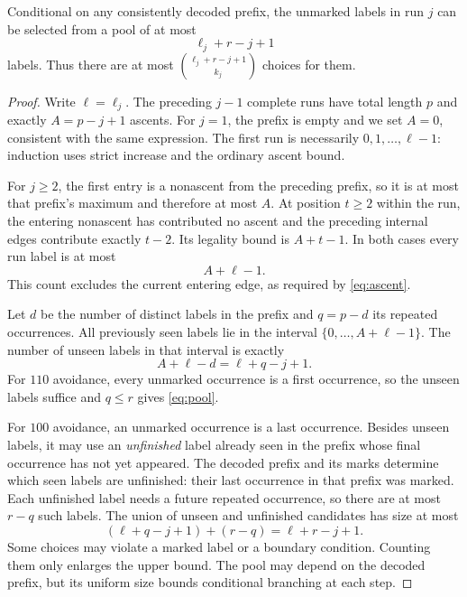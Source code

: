 \begin{lemma}\label{lem:pool}
Conditional on any consistently decoded prefix, the unmarked labels in run $j$ can be selected from a pool of at most
\begin{equation}\label{eq:pool}
 \ell_j+r-j+1
\end{equation}
labels. Thus there are at most $\binom{\ell_j+r-j+1}{k_j}$ choices for them.
\end{lemma}
\begin{proof}
Write $\ell=\ell_j$. The preceding $j-1$ complete runs have total length $p$ and exactly $A=p-j+1$ ascents. For $j=1$, the prefix is empty and we set $A=0$, consistent with the same expression. The first run is necessarily $0,1,\ldots,\ell-1$: induction uses strict increase and the ordinary ascent bound.

For $j\ge2$, the first entry is a nonascent from the preceding prefix, so it is at most that prefix's maximum and therefore at most $A$. At position $t\ge2$ within the run, the entering nonascent has contributed no ascent and the preceding internal edges contribute exactly $t-2$. Its legality bound is $A+t-1$. In both cases every run label is at most
\begin{equation}\label{eq:ceiling}
 A+\ell-1.
\end{equation}
This count excludes the current entering edge, as required by \eqref{eq:ascent}.

Let $d$ be the number of distinct labels in the prefix and $q=p-d$ its repeated occurrences. All previously seen labels lie in the interval $\{0,\ldots,A+\ell-1\}$. The number of unseen labels in that interval is exactly
\[
 A+\ell-d=\ell+q-j+1.
\]
For $110$ avoidance, every unmarked occurrence is a first occurrence, so the unseen labels suffice and $q\le r$ gives \eqref{eq:pool}.

For $100$ avoidance, an unmarked occurrence is a last occurrence. Besides unseen labels, it may use an \emph{unfinished} label already seen in the prefix whose final occurrence has not yet appeared. The decoded prefix and its marks determine which seen labels are unfinished: their last occurrence in that prefix was marked. Each unfinished label needs a future repeated occurrence, so there are at most $r-q$ such labels. The union of unseen and unfinished candidates has size at most
\[
 (\ell+q-j+1)+(r-q)=\ell+r-j+1.
\]
Some choices may violate a marked label or a boundary condition. Counting them only enlarges the upper bound. The pool may depend on the decoded prefix, but its uniform size bounds conditional branching at each step.
\end{proof}

